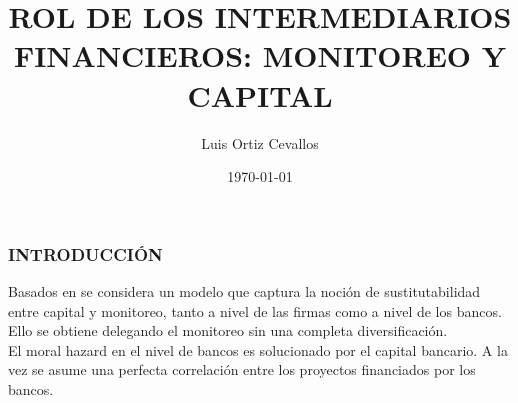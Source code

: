 \documentclass[10pt, xcolor=table, x11names]{beamer}
\title[]{ROL DE LOS INTERMEDIARIOS FINANCIEROS: MONITOREO Y CAPITAL}
\author[Luis Ortiz]{Luis Ortiz Cevallos}
\institute[SECMCA]{\bf SECMCA}
\date[\today]{\footnotesize \today}
\begin{document}
\begin{frame}
\titlepage
\end{frame}




\begin{frame}
	\frametitle{{\normalsize INTRODUCCIÓN} {}}
Basados en  \cite{Tirole1997} se considera un modelo que captura la noción de sustitutabilidad entre capital y monitoreo, tanto a nivel de las firmas como a nivel de los bancos. Ello se obtiene delegando el monitoreo sin una completa diversificación. \\
El moral hazard en el nivel de bancos es solucionado por el capital bancario. A la vez se asume una perfecta correlación entre los proyectos financiados por los bancos.\\



 

\end{frame}
\end{document}

